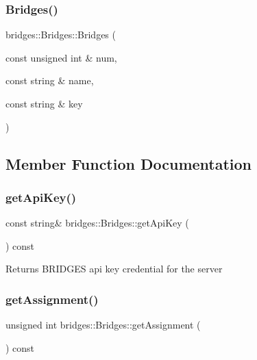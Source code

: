 \subsubsection{\texorpdfstring{Bridges()}{Bridges()}\hspace{0.1cm}{\footnotesize\ttfamily [3/3]}}
{\footnotesize\ttfamily bridges\+::\+Bridges\+::\+Bridges (\begin{DoxyParamCaption}\item[{const unsigned int \&}]{num,  }\item[{const string \&}]{name,  }\item[{const string \&}]{key }\end{DoxyParamCaption})\hspace{0.3cm}{\ttfamily [inline]}}



\subsection{Member Function Documentation}
\mbox{\label{classbridges_1_1_bridges_a9a44f38d883859ef19c94ce17eec43b5}} 
\subsubsection{\texorpdfstring{getApiKey()}{getApiKey()}}
{\footnotesize\ttfamily const string\& bridges\+::\+Bridges\+::get\+Api\+Key (\begin{DoxyParamCaption}{ }\end{DoxyParamCaption}) const\hspace{0.3cm}{\ttfamily [inline]}}

\begin{DoxyReturn}{Returns}
B\+R\+I\+D\+G\+ES api key credential for the server 
\end{DoxyReturn}
\mbox{\label{classbridges_1_1_bridges_aa45b4ba781b5cbecc8cb04c76dfd527a}} 
\subsubsection{\texorpdfstring{getAssignment()}{getAssignment()}}
{\footnotesize\ttfamily unsigned int bridges\+::\+Bridges\+::get\+Assignment (\begin{DoxyParamCaption}{ }\end{DoxyParamCaption}) const\hspace{0.3cm}{\ttfamily [inline]}}

